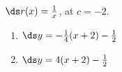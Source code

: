 {$\ds r(x) = \frac{1}{x}$, at $c=-2$.
}
{\begin{enumerate}
\item		$\ds y = -\frac{1}{4}(x+2) - \frac{1}{2}$
\item		$\ds y = 4(x+2) - \frac{1}{2}$
\end{enumerate}
}
